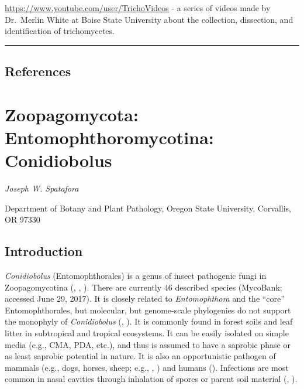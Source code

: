 \documentclass[]{book}
\begin{document}
\url{https://www.youtube.com/user/TrichoVideos} - a series of videos made by Dr.~Merlin White at Boise State University about the collection, dissection, and identification of trichomycetes.

\begin{center}\rule{0.5\linewidth}{\linethickness}\end{center}

\hypertarget{references-2}{%
\section{References}\label{references-2}}

\hypertarget{Conidiobolus}{%
\chapter{Zoopagomycota: Entomophthoromycotina: Conidiobolus}\label{Conidiobolus}}

\emph{Joseph W. Spatafora}

Department of Botany and Plant Pathology, Oregon State University, Corvallis, OR 97330

\hypertarget{introduction-3}{%
\section{Introduction}\label{introduction-3}}

\emph{Conidiobolus} (Entomophthorales) is a genus of insect pathogenic fungi in Zoopagomycotina (\citet{King_1976}, \citet{King_1976B}, \citet{King_1977}). There are currently 46 described species (MycoBank; accessed June 29, 2017). It is closely related to \emph{Entomophthora} and the ``core'' Entomophthorales, but molecular, but genome-scale phylogenies do not support the monophyly of \emph{Conidiobolus} (\citet{Gryganskyi_2012}, \citet{Gryganskyi_2013}). It is commonly found in forest soils and leaf litter in subtropical and tropical ecosystems. It can be easily isolated on simple media (e.g., CMA, PDA, etc.), and thus is assumed to have a saprobic phase or as least saprobic potential in nature. It is also an opportunistic pathogen of mammals (e.g., dogs, horses, sheep; e.g., \citet{Humber_1989}, \citet{Vilela_2010}) and humans (\citet{Chander_2017}). Infections are most common in nasal cavities through inhalation of spores or parent soil material (\citet{Mackey_2015}, \citet{Jain_2015}).
\end{document}
